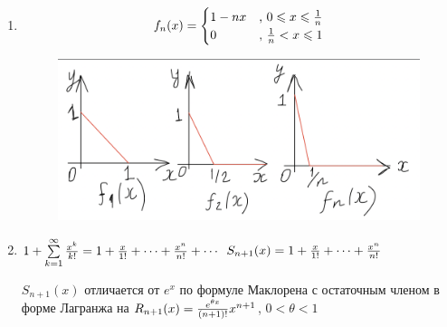 \documentclass[a4paper,12pt]{article} %
\renewcommand {\leq}{\leqslant}
\begin{document}
\begin{enumerate}
	
	\item 
	\begin{equation*}
		f_n(x) = 
		\begin{cases}
			1-nx &\text{, $0 \leq x \leq {1 \over n}$}\\
			0 &\text{, ${1\over n}< x\leq 1$}
		\end{cases}
	\end{equation*}
	\begin{figure}[h!]
		\centering
		\includegraphics[scale = 0.5]{pictures/10_bilet_primer1.png}
	\end{figure}
	\item
	$1 + \sum\limits_{k=1}^\infty {x^k \over k!}  = 1 + {x\over 1!} + \cdots + {x^n \over n!} + \cdots$ \newline
	$S_{n+1}(x) = 1 + {x\over 1!} + \cdots + {x^n \over n!}$ \newline
	
	$S_{n+1}(x)$ отличается от $e^x$ по формуле Маклорена с остаточным членом в форме Лагранжа на $R_{n+1}(x)= {e^{\theta x}\over {(n+1)!}} x^{n+1}$,  $0 < \theta < 1$
\end{enumerate}
\end{document}
